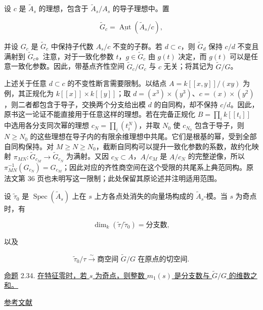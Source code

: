 设 $c$ 是 $\widetilde A_s$ 的理想，包含于 $\widetilde A_s/A_s$ 的导子理想中。置

\begin{equation*}
\widetilde G_c=\underline{\operatorname{Aut}}(\widetilde A_s/c),
\end{equation*}

并设 $G_c$ 是 $\widetilde G_c$ 中保持子代数 $A_s/c$ 不变的子群。若 $d\subset c$，则 $\widetilde G_d$ 保持 $c/d$ 不变且满射到 $\widetilde G_c$。注意，对于一致化参数 $t$，$g\in\widetilde G_c$ 由 $g(t)$ 决定，而 $g(t)$ 可以是任意一致化参数。因此，带基点齐性空间 $\widetilde G_c/G_c$ 与 $c$ 无关；将其记为 $\widetilde G/G$。
\begin{editorialnote}
上述关于任意 $d\subset c$ 的不变性断言需要限制。以结点 $A=k[[x,y]]/(xy)$ 为例，其正规化为 $k[[x]]\times k[[y]]$；取 $d=(x^3)\times(y^3)$、$c=(x)\times(y^2)$，则二者都包含于导子，交换两个分支给出模 $d$ 的自同构，却不保持 $c/d$。因此，原书这一论证不能直接用于任意这样的理想。若在完备正规化 $B=\prod_i k[[t_i]]$ 中选用各分支同次幂的理想 $c_N=\prod_i(t_i^N)$，并取 $N_0$ 使 $c_{N_0}$ 包含于导子，则 $N\geq N_0$ 的这些理想在导子内的有限余维理想中共尾。它们是根基的幂，受到全部自同构保持。对 $M\geq N\geq N_0$，截断自同构可以提升一致化参数的系数，故约化映射 $\pi_{MN}:\widetilde G_{c_M}\to\widetilde G_{c_N}$ 为满射。又因 $c_N\subset A$，$A/c_M$ 是 $A/c_N$ 的完整逆像，所以 $\pi_{MN}^{-1}(G_{c_N})=G_{c_M}$；因此对应的齐性商空间在这个受限的共尾系上典范同构。原法文第 36 页也未明写这一限制；此处保留其原论述并注明适用范围。
\end{editorialnote}

设 $\widetilde\tau_0$ 是 $\operatorname{Spec}(\widetilde A_s)$ 上在 $s$ 上方各点处消失的向量场构成的 $\widetilde A_s$-模。当 $s$ 为奇点时，有

\begin{equation*}
\dim_k(\widetilde\tau/\widetilde\tau_0)
=\text{分支数},
\end{equation*}

以及

\begin{equation*}
\widetilde\tau_0/\tau\overset\sim\longrightarrow
\text{商空间 }\widetilde G/G\text{ 在原点的切空间}.
\end{equation*}


\underline{命题} 2.34. \underline{在特征零时，若 $s$ 为奇点，则整数 $m_1(s)$ 是分支数与 $\widetilde G/G$ 的维数之和。}

\bigskip
\begin{center}
\underline{\textsc{参考文献}}
\end{center}

